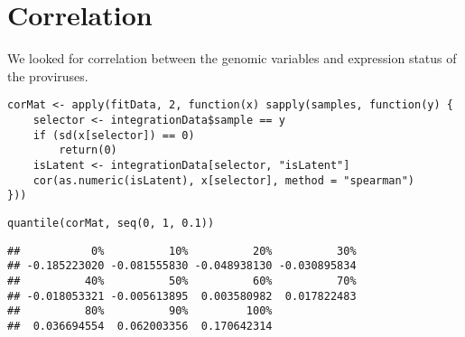 \documentclass[../../sherrill-Mix_thesis.tex]{subfiles}
\makeatletter
\newenvironment{kframe}{%
 \def\at@end@of@kframe{}%
 \ifinner\ifhmode%
  \def\at@end@of@kframe{\end{minipage}}%
  \begin{minipage}{\columnwidth}%
 \fi\fi%
 \def\FrameCommand##1{\hskip\@totalleftmargin \hskip-\fboxsep
 \colorbox{shadecolor}{##1}\hskip-\fboxsep
     \hskip-\linewidth \hskip-\@totalleftmargin \hskip\columnwidth}%
 \MakeFramed {\advance\hsize-\width
   \@totalleftmargin\z@ \linewidth\hsize
   \@setminipage}}%
 {\par\unskip\endMakeFramed%
 \at@end@of@kframe}
\newenvironment{knitrout}{}{} %
\makeatother
\begin{document}
\section{Correlation}
We looked for correlation between the genomic variables and expression status of the proviruses.
\begin{knitrout}
\color{fgcolor}\begin{kframe}
\begin{lstlisting}[basicstyle=\ttfamily,breaklines=true]
corMat <- apply(fitData, 2, function(x) sapply(samples, function(y) {
    selector <- integrationData$sample == y
    if (sd(x[selector]) == 0) 
        return(0)
    isLatent <- integrationData[selector, "isLatent"]
    cor(as.numeric(isLatent), x[selector], method = "spearman")
}))\end{lstlisting}
\begin{lstlisting}[basicstyle=\ttfamily,breaklines=true]
quantile(corMat, seq(0, 1, 0.1))\end{lstlisting}
\begin{lstlisting}[basicstyle=\ttfamily,breaklines=true]
##           0%          10%          20%          30% 
## -0.185223020 -0.081555830 -0.048938130 -0.030895834 
##          40%          50%          60%          70% 
## -0.018053321 -0.005613895  0.003580982  0.017822483 
##          80%          90%         100% 
##  0.036694554  0.062003356  0.170642314
\end{lstlisting}
\end{kframe}
\end{knitrout}
\end{document}
